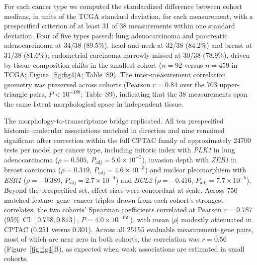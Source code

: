 For each cancer type we computed the standardized difference between cohort
medians, in units of the TCGA standard deviation, for each measurement, with a
prespecified criterion of at least 31 of 38 measurements within one standard
deviation. Four of five types passed: lung adenocarcinoma and pancreatic
adenocarcinoma at 34/38 (89.5\%), head-and-neck at 32/38 (84.2\%) and breast at
31/38 (81.6\%); endometrial carcinoma narrowly missed at 30/38 (78.9\%), driven by
tissue-composition shifts in the smallest cohort ($n = 92$ versus $n = 459$ in
TCGA; Figure~\ref{fig:fig4}A; Table~S9). The inter-measurement correlation
geometry was preserved across cohorts (Pearson $r = 0.84$ over the 703
upper-triangle pairs, $P < 10^{-180}$; Table~S9), indicating that the 38
measurements span the same latent morphological space in independent tissue.

The morphology-to-transcriptome bridge replicated. All ten prespecified
histomic--molecular associations matched in direction and nine remained
significant after correction within the full CPTAC family of approximately
\num{24700} tests per model per cancer type, including mitotic index with
\textit{PLK1} in lung adenocarcinoma ($\rho = 0.505$,
$P_{\mathrm{adj}} = 5.0 \times 10^{-5}$), invasion depth with \textit{ZEB1} in
breast carcinoma ($\rho = 0.319$, $P_{\mathrm{adj}} = 4.6 \times 10^{-3}$) and
nuclear pleomorphism with \textit{ESR1} ($\rho = -0.389$,
$P_{\mathrm{adj}} = 2.7 \times 10^{-4}$) and \textit{BCL2}
($\rho = -0.416$, $P_{\mathrm{adj}} = 7.7 \times 10^{-5}$). Beyond the
prespecified set, effect sizes were concordant at scale. Across 750 matched
feature--gene--cancer triples drawn from each cohort's strongest correlates, the
two cohorts' Spearman coefficients correlated at Pearson $r = 0.787$ (95\%~CI
$[0.758, 0.813]$, $P = 4.0 \times 10^{-159}$), with mean $|\rho|$ modestly
attenuated in CPTAC (0.251 versus 0.301). Across all \num{25155} evaluable
measurement--gene pairs, most of which are near zero in both cohorts, the
correlation was $r = 0.56$ (Figure~\ref{fig:fig4}B), as expected when weak
associations are estimated in small cohorts.

